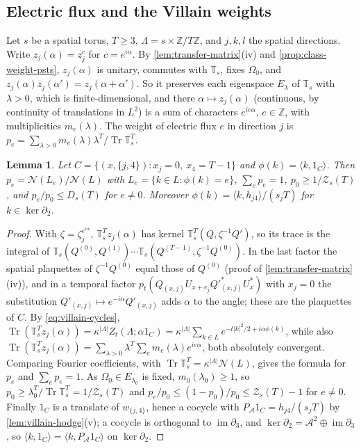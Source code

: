 \documentclass[11pt,a4paper]{amsart}
\newtheorem{lemma}[theorem]{Lemma}
\theoremstyle{definition}
\theoremstyle{remark}
\numberwithin{equation}{section}
\DeclareMathOperator{\Tr}{Tr}        %
\newcommand{\Z}{\mathbb{Z}}          %
\newcommand{\ip}[2]{\langle #1,#2\rangle}  %
\newcommand{\abs}[1]{\lvert #1\rvert}      %
\newcommand{\TT}{\mathbb{T}}               %
\newcommand{\Zc}{\mathcal{Z}}              %
\newcommand{\Zs}[2]{\Zc_{#1}(#2)}          %
\newcommand{\Dexc}[2]{D_{#1}(#2)}          %
\newcommand{\lzero}{\lambda_0}             %
\newcommand{\Omegazero}{\Omega_0}          %
\begin{document}
\subsection{Electric flux and the Villain weights}

Let $s$ be a spatial torus, $T\ge3$, $\Lambda=s\times\Z/T\Z$, and $j,k,l$ the spatial directions. Write $z_j(\alpha)=z_j^{c}$ for $c=e^{i\alpha}$. By \cref{lem:transfer-matrix}(iv) and \cref{prop:class-weight-psts}, $z_j(\alpha)$ is unitary, commutes with $\TT_s$, fixes $\Omegazero$, and $z_j(\alpha)z_j(\alpha')=z_j(\alpha+\alpha')$. So it preserves each eigenspace $E_\lambda$ of $\TT_s$ with $\lambda>0$, which is finite-dimensional, and there $\alpha\mapsto z_j(\alpha)$ (continuous, by continuity of translations in $L^2$) is a sum of characters $e^{ie\alpha}$, $e\in\Z$, with multiplicities $m_e(\lambda)$. The weight of electric flux $e$ in direction $j$ is $p_e=\sum_{\lambda>0}m_e(\lambda)\lambda^T/\Tr\TT_s^T$.

\begin{lemma}\label{lem:villain-flux}
Let $C=\{(x,\{j,4\}):x_j=0,\ x_4=T-1\}$ and $\phi(k)=\ip k{1_C}$. Then $p_e=\mathcal N(L_e)/\mathcal N(L)$ with $L_e=\{k\in L:\phi(k)=e\}$, $\sum_ep_e=1$, $p_0\ge1/\Zs sT$, and $p_e/p_0\le\Dexc sT$ for $e\ne0$. Moreover $\phi(k)=\ip k{h_{j4}}/(s_jT)$ for $k\in\ker\partial_2$.
\end{lemma}

\begin{proof}
With $\zeta=\zeta_j^{e^{i\alpha}}$, $\TT_s^Tz_j(\alpha)$ has kernel $\TT_s^T(Q,\zeta^{-1}Q')$, so its trace is the integral of $\TT_s(Q^{(0)},Q^{(1)})\cdots\TT_s(Q^{(T-1)},\zeta^{-1}Q^{(0)})$. In the last factor the spatial plaquettes of $\zeta^{-1}Q^{(0)}$ equal those of $Q^{(0)}$ (proof of \cref{lem:transfer-matrix}(iv)), and in a temporal factor $p_t(Q_{(x,j)}U_{x+e_j}Q'^*_{(x,j)}U_x^*)$ with $x_j=0$ the substitution $Q'_{(x,j)}\mapsto e^{-i\alpha}Q'_{(x,j)}$ adds $\alpha$ to the angle; these are the plaquettes of $C$. By \eqref{eq:villain-cycles}, $\Tr(\TT_s^Tz_j(\alpha))=\kappa^{|\Lambda|}Z_t(\Lambda;\alpha1_C)=\kappa^{|\Lambda|}\sum_{k\in L}e^{-t\abs k^2/2+i\alpha\phi(k)}$, while also $\Tr(\TT_s^Tz_j(\alpha))=\sum_{\lambda>0}\lambda^T\sum_em_e(\lambda)e^{ie\alpha}$, both absolutely convergent. Comparing Fourier coefficients, with $\Tr\TT_s^T=\kappa^{|\Lambda|}\mathcal N(L)$, gives the formula for $p_e$ and $\sum_ep_e=1$. As $\Omegazero\in E_{\lzero}$ is fixed, $m_0(\lzero)\ge1$, so $p_0\ge\lzero^T/\Tr\TT_s^T=1/\Zs sT$ and $p_e/p_0\le(1-p_0)/p_0\le\Zs sT-1$ for $e\ne0$. Finally $1_C$ is a translate of $w_{\{j,4\}}$, hence a cocycle with $P_{\mathcal A}1_C=h_{j4}/(s_jT)$ by \cref{lem:villain-hodge}(v); a cocycle is orthogonal to $\operatorname{im}\partial_3$, and $\ker\partial_2=\mathcal A^2\oplus\operatorname{im}\partial_3$, so $\ip k{1_C}=\ip k{P_{\mathcal A}1_C}$ on $\ker\partial_2$.
\end{proof}
\end{document}
